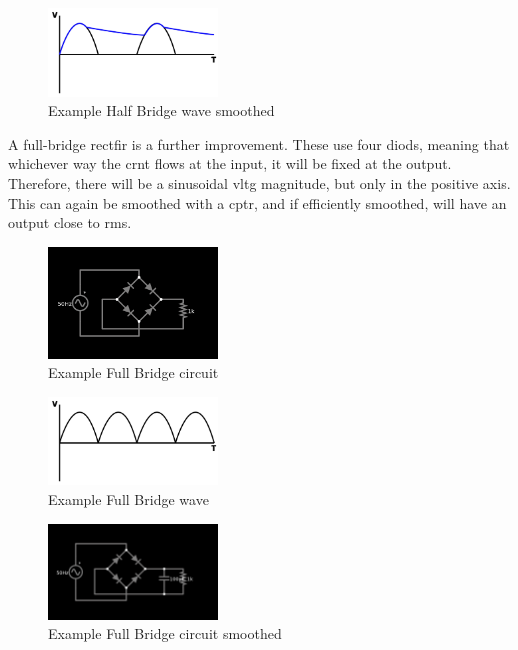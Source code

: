 \documentclass[a4paper,11pt]{report}
\begin{document}
\begin{figure}[H]
\centering
\includegraphics[width=0.4\textwidth]{halfbridgewavesmoothed}
\caption{Example Half Bridge wave smoothed}
\end{figure}

\vspace*{1\baselineskip}

A full-bridge \gls{rectfir} is a further improvement. These use four \gls{diod}s, meaning that whichever way the \gls{crnt} flows at the input, it will be fixed at the output. Therefore, there will be a sinusoidal \gls{vltg} magnitude, but only in the positive axis. This can again be smoothed with a \gls{cptr}, and if efficiently smoothed, will have an output close to \gls{rms}.

\vspace*{1\baselineskip}

\begin{figure}[H]
\centering
\includegraphics[width=0.4\textwidth]{fullbridge}
\caption{Example Full Bridge circuit}
\end{figure}

\begin{figure}[H]
\centering
\includegraphics[width=0.4\textwidth]{fullbridgewave}
\caption{Example Full Bridge wave}
\end{figure}

\vspace*{1\baselineskip}

\begin{figure}[H]
\centering
\includegraphics[width=0.4\textwidth]{fullbridgesmoothed}
\caption{Example Full Bridge circuit smoothed}
\end{figure}
\end{document}
